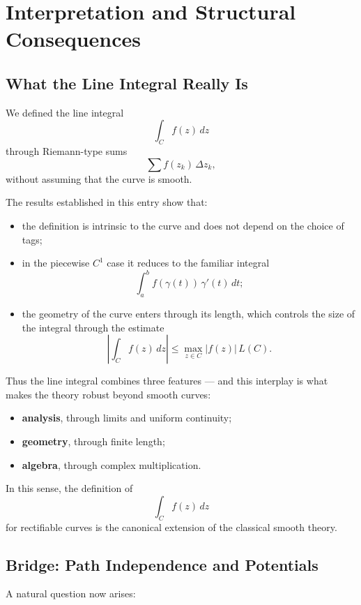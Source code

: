 \documentclass{article}
\begin{document}
\section{Interpretation and Structural Consequences}

\subsection{What the Line Integral Really Is}

We defined the line integral
\[
\int_C f(z)\,dz
\]
through Riemann-type sums
\[
\sum f(z_k)\,\Delta z_k,
\]
without assuming that the curve is smooth.

The results established in this entry show that:

\begin{itemize}
    \item the definition is intrinsic to the curve and does not depend on the choice of tags;
    \item in the piecewise \(C^1\) case it reduces to the familiar integral
    \[
    \int_a^b f(\gamma(t))\,\gamma'(t)\,dt;
    \]
    \item the geometry of the curve enters through its length, which controls the size of the integral through the estimate
    \[
    \left|\int_C f(z)\,dz\right|
    \le \max_{z\in C}|f(z)|\,L(C).
    \]
\end{itemize}

Thus the line integral combines three features — and this interplay is what makes the theory robust beyond smooth curves:

\begin{itemize}
    \item \textbf{analysis}, through limits and uniform continuity;
    \item \textbf{geometry}, through finite length;
    \item \textbf{algebra}, through complex multiplication.
\end{itemize}

In this sense, the definition of
\[
\int_C f(z)\,dz
\]
for rectifiable curves is the canonical extension of the classical smooth theory.

\subsection{Bridge: Path Independence and Potentials}

A natural question now arises:
\end{document}

